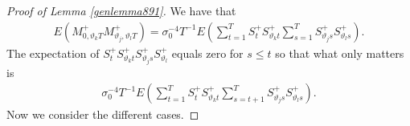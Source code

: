{{\begin{proof}[Proof of Lemma \ref{genlemma891}] We have that 
\begin{align*}
      E\left(  M^+_{0,\vartheta_k  T}  M^+_{\vartheta_j ,\vartheta_l   T} \right) =  \sigma^{-4}_0 T^{-1}  E\left(  \sum_{t = 1}^T  S^+_{t} S^+_{\vartheta_k t}  \sum_{s = 1}^T  S^+_{\vartheta_j s} S^+_{ \vartheta_l  s}  \right). 
\end{align*}
The expectation of $S^+_{t} S^+_{\vartheta_k t}  S^+_{\vartheta_j s} S^+_{ \vartheta_l}$ equals zero for $s \leq t$ so that what only matters is 
\begin{align}
\sigma^{-4}_0 T^{-1}  E\left(  \sum_{t = 1}^T  S^+_{t} S^+_{\vartheta_k t}  \sum_{s = t+1}^T  S^+_{\vartheta_j s} S^+_{ \vartheta_l  s}  \right). \label{abgen}
\end{align}
Now we consider the different cases. 


\end{proof}}}
